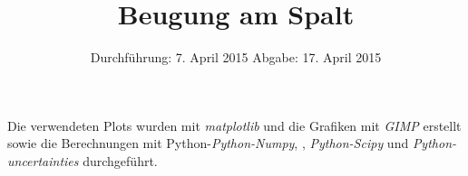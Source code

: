
\subject{Anfängerpraktikum V406}
\title{Beugung am Spalt}
\date{
  Durchführung: 7. April 2015
  \hspace{1em}
  Abgabe: 17. April 2015
}


\maketitle
\thispagestyle{empty}
\newpage





\newpage
\printbibliography
Die verwendeten Plots wurden mit \textit{matplotlib}\cite{matplotlib} und die Grafiken mit \textit{GIMP}\cite{gimp} erstellt sowie die Berechnungen mit Python-\textit{Python-Numpy}, \cite{numpy}, \textit{Python-Scipy}\cite{scipy} und \textit{Python-uncertainties}\cite{uncertainties} durchgeführt.

